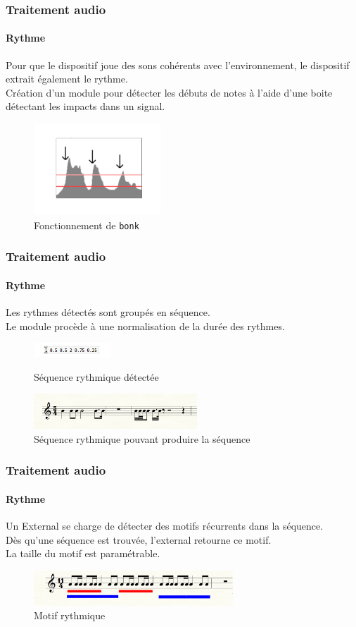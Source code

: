 \documentclass{beamer}
\begin{document}
\begin{frame}
\frametitle{Traitement audio}
\framesubtitle{Rythme}
Pour que le dispositif joue des sons cohérents avec l’environnement, le dispositif extrait également le rythme.\\
Création d'un module pour détecter les débuts de notes à l'aide d'une boite détectant les impacts dans un signal.

\begin{figure}
\centering
\includegraphics[height=130px]{bonk.jpg}
\caption{Fonctionnement de \texttt{bonk}}
\end{figure}
\end{frame}


\begin{frame}
\frametitle{Traitement audio}
\framesubtitle{Rythme}
Les rythmes détectés sont groupés en séquence.\\
Le module procède à une normalisation de la durée des rythmes.
\begin{figure}
\centering
\includegraphics[height=20px]{rythme.jpg}
\caption{Séquence rythmique détectée}
\includegraphics[height=50px]{structurerythme.jpg}
\caption{Séquence rythmique pouvant produire la séquence}
\end{figure}
\end{frame}

\begin{frame}
\frametitle{Traitement audio}
\framesubtitle{Rythme}
Un External se charge de détecter des motifs récurrents dans la séquence.\\
Dès qu'une séquence est trouvée, l'external retourne ce motif.\\
La taille du motif est paramétrable.
\begin{figure}
\centering
\includegraphics[height=50px]{motifrythme.jpg}
\caption{Motif rythmique}
\end{figure}
\end{frame}
\end{document}
